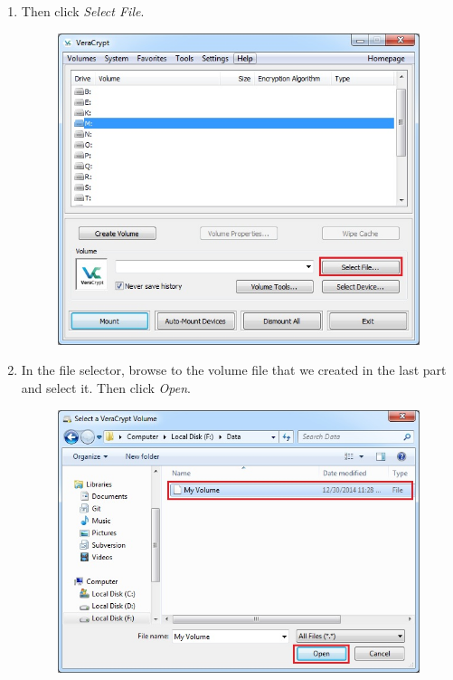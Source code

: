 \documentclass{tufte-handout}
\begin{document}
\begin{enumerate}
	\item Then click \textit{Select File}.
	\begin{figure}%
		\includegraphics[width=.8\linewidth]{img/vc_mount_2.png}
	\end{figure}
	\FloatBarrier	
	
	\item In the file selector, browse to the volume file that we created in the last part and select it. Then click \textit{Open}.
	\begin{figure}%
		\includegraphics[width=.85\linewidth]{img/vc_mount_3.png}
	\end{figure}
	\FloatBarrier
	


\end{enumerate}
\end{document}
